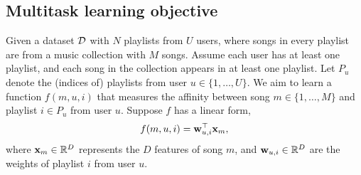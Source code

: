 \subsection{Multitask learning objective}

Given a dataset $\mathcal{D}$ with $N$ playlists from $U$ users, 
where songs in every playlist are from a music collection with $M$ songs.
Assume each user has at least one playlist, and each song in the collection 
appears in at least one playlist.
%
Let $P_u$ denote the (indices of) playlists from user $u \in \{1,\dots,U\}$.
We aim to learn a function $f(m, u, i)$ that measures the affinity between 
song $m \in \{1,\dots,M\}$ and playlist $i \in P_u$ from user $u$.
Suppose $f$ has a linear form, \ie
\begin{equation}
\label{eq:scorefunc}
f(m, u, i) = \mathbf{w}_{u,i}^\top \mathbf{x}_m,
\end{equation}
where %
$\mathbf{x}_m \in \mathbb{R}^D$ represents the $D$ features of song $m$,
and $\mathbf{w}_{u,i} \in \mathbb{R}^D$ are the weights %
of playlist $i$ from user $u$.



